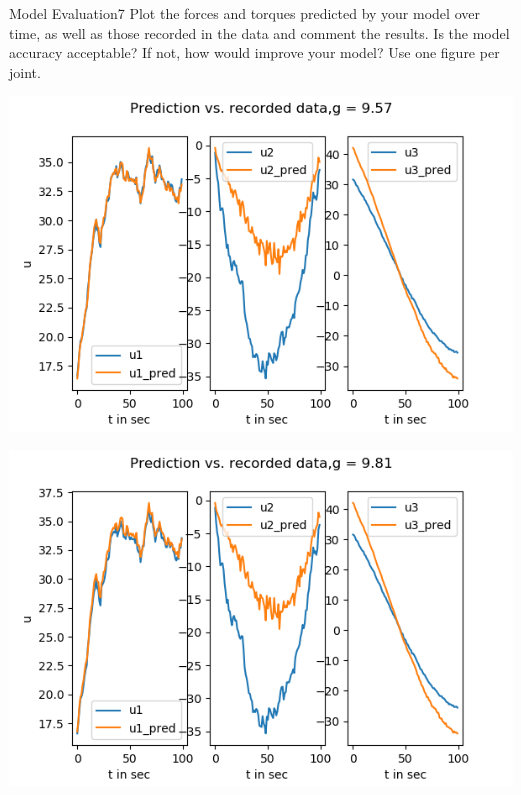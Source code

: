 \begin{questions}


\begin{question}{Model Evaluation}{7}
Plot the forces and torques predicted by your model over time, as well as those recorded in the data and comment the results. Is the model accuracy acceptable? If not, how would improve your model? Use one figure per joint.

\begin{answer}


\begin{minipage}{0.5\textwidth}
	\begin{center}
		\includegraphics[width=1\textwidth]{img/1f-g_wrong.png} 
	\end{center}
\end{minipage} \hfill
\begin{minipage}{0.5\textwidth}
	\begin{center}
		\includegraphics[width=1\textwidth]{img/1f-g_correct.png} 
	\end{center}
\end{minipage} \hfill


\end{answer}
\end{question}
\end{questions}
